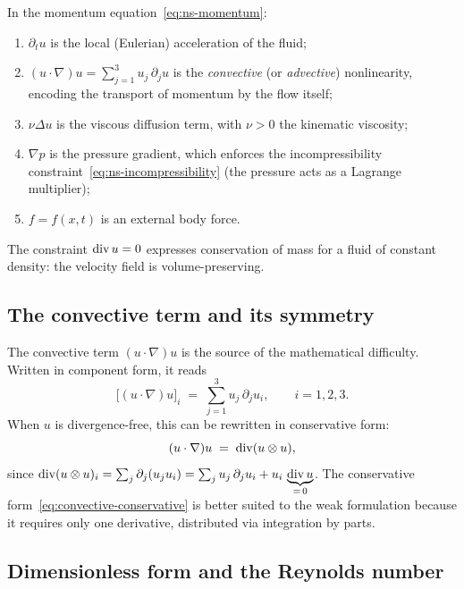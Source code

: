 \begin{remark}
  In the momentum equation~\eqref{eq:ns-momentum}:
  \begin{enumerate}[label=(\roman*)]
    \item $\partial_{t} u$ is the local (Eulerian) acceleration of the fluid;
    \item $(u \cdot \nabla) u = \sum_{j=1}^{3} u_{j}\,\partial_{j} u$ is the
      \emph{convective} (or \emph{advective}) nonlinearity, encoding the transport of
      momentum by the flow itself;
    \item $\nu \Delta u$ is the viscous diffusion term, with $\nu > 0$ the kinematic
      viscosity;
    \item $\nabla p$ is the pressure gradient, which enforces the incompressibility
      constraint~\eqref{eq:ns-incompressibility} (the pressure acts as a Lagrange
      multiplier);
    \item $f = f(x, t)$ is an external body force.
  \end{enumerate}
  The constraint $\operatorname{div} u = 0$ expresses conservation of mass for a fluid of
  constant density: the velocity field is volume-preserving.
\end{remark}

\subsection{The convective term and its symmetry}

The convective term $(u \cdot \nabla)u$ is the source of the mathematical difficulty.
Written in component form, it reads
\[
  \bigl[(u \cdot \nabla) u\bigr]_{i}
  \;=\;
  \sum_{j=1}^{3} u_{j}\,\partial_{j} u_{i},
  \qquad i = 1, 2, 3.
\]
When $u$ is divergence-free, this can be rewritten in conservative form:
\begin{equation}\label{eq:convective-conservative}
  (u \cdot \nabla) u
  \;=\;
  \operatorname{div}(u \otimes u),
\end{equation}
since $\operatorname{div}(u \otimes u)_{i} = \sum_{j} \partial_{j}(u_{j} u_{i})
= \sum_{j} u_{j}\,\partial_{j} u_{i} + u_{i}\,\underbrace{\operatorname{div} u}_{=\,0}$.
The conservative form~\eqref{eq:convective-conservative} is better suited to the weak
formulation because it requires only one derivative, distributed via integration by
parts.

\subsection{Dimensionless form and the Reynolds number}

